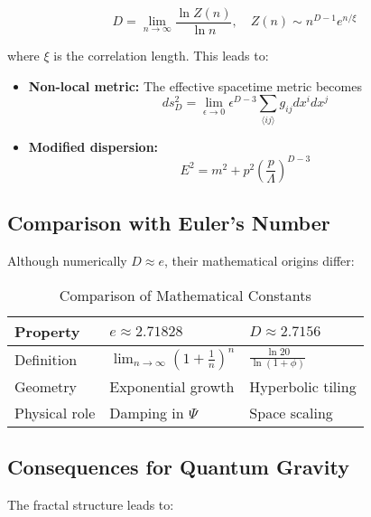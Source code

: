 \begin{equation}  
D = \lim_{n\to\infty} \frac{\ln Z(n)}{\ln n}, \quad Z(n) \sim n^{D-1}e^{n/\xi}  
\end{equation}  

where $\xi$ is the correlation length. This leads to:  

\begin{itemize}  
\item \textbf{Non-local metric:} The effective spacetime metric becomes  
\begin{equation}  
ds^2_D = \lim_{\epsilon\to 0} \epsilon^{D-3} \sum_{\langle ij\rangle} g_{ij} dx^i dx^j  
\end{equation}  

\item \textbf{Modified dispersion:}  
\begin{equation}  
E^2 = m^2 + p^2 \left(\frac{p}{\Lambda}\right)^{D-3}  
\end{equation}  
\end{itemize}  

\subsection{Comparison with Euler's Number}  
\label{subsec:euler_comparison}  

Although numerically $D \approx e$, their mathematical origins differ:  

\begin{table}[ht]
\centering  
\caption{Comparison of Mathematical Constants}  
\begin{tabular}{lll}  
\toprule  
Property & $e \approx 2.71828$ & $D \approx 2.7156$ \\  
\midrule  
Definition & $\lim_{n\to\infty}(1+\frac{1}{n})^n$ & $\frac{\ln 20}{\ln(1+\phi)}$ \\  
Geometry & Exponential growth & Hyperbolic tiling \\  
Physical role & Damping in $\Psi$ & Space scaling \\  
\bottomrule  
\end{tabular}  
\end{table}  

\subsection{Consequences for Quantum Gravity}  
\label{subsec:quantum_gravity}  

The fractal structure leads to:  

